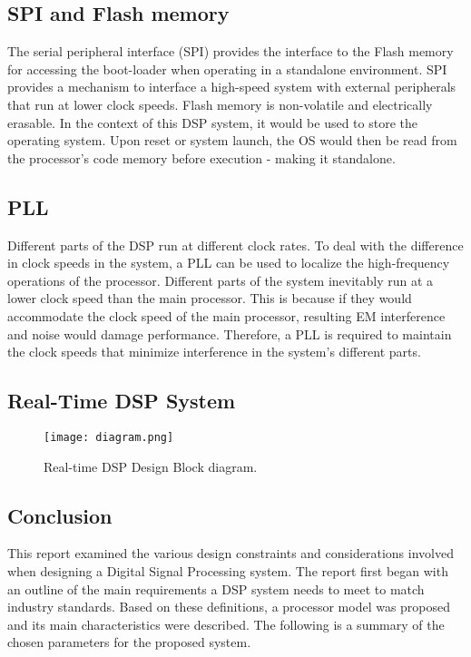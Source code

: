 \subsection{SPI and Flash memory}

The serial peripheral interface (SPI) provides the interface to the Flash memory for accessing the boot-loader when operating in a standalone environment. SPI provides a mechanism to interface a high-speed system with external peripherals that run at lower clock speeds. Flash memory is non-volatile and electrically erasable. In the context of this DSP system, it would be used to store the operating system. Upon reset or system launch, the OS would then be read from the processor’s code memory before execution - making it standalone. 


\subsection{PLL}
Different parts of the DSP run at different clock rates. To deal with the difference in clock speeds in the system, a PLL can be used to localize the high-frequency operations of the processor. Different parts of the system inevitably run at a lower clock speed than the main processor. This is because if they would accommodate the clock speed of the main processor, resulting EM interference and noise would damage performance. Therefore, a PLL is required to maintain the clock speeds that minimize interference in the system’s different parts. 


\subsection{Real-Time DSP System}

\begin{figure}[h!]
	\centering
	\texttt{[image: diagram.png]}
	\caption{Real-time DSP Design Block diagram.}
	\label{fig:block}
\end{figure}



\subsection{Conclusion}
This report examined the various design constraints and considerations involved when designing a Digital Signal Processing system. The report first began with an outline of the main requirements a DSP system needs to meet to match industry standards. Based on these definitions, a processor model was proposed and its main characteristics were described. The following is a summary of the chosen parameters for the proposed system. 


